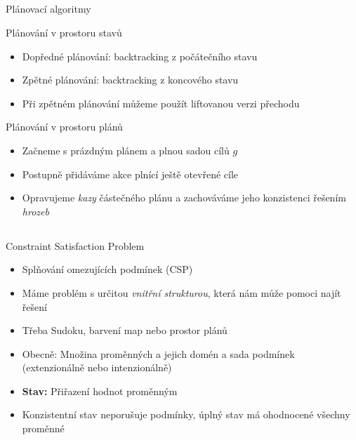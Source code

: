 \documentclass{beamer}
\begin{document}
\subsection{}
\begin{frame}{Plánovací algoritmy}
\begin{block}{Plánování v prostoru stavů}
\begin{itemize}
\item Dopředné plánování: backtracking z počátečního stavu
\item Zpětné plánování: backtracking z koncového stavu
\item Při zpětném plánování můžeme použít liftovanou verzi přechodu
\end{itemize}
\end{block}
\begin{block}{Plánování v prostoru plánů}
\begin{itemize}
\item Začneme s prázdným plánem a plnou sadou cílů $g$
\item Postupně přidáváme akce plnící ještě otevřené cíle
\item Opravujeme {\em kazy} částečného plánu a zachováváme jeho konzistenci řešením {\em hrozeb}
\end{itemize}
\end{block}
\end{frame}

\subsection{}
\begin{frame}{Constraint Satisfaction Problem}
\begin{itemize}
\item Splňování omezujících podmínek (CSP)
\item Máme problém s určitou {\em vnitřní strukturou}, která nám může pomoci najít řešení
\item Třeba Sudoku, barvení map nebo prostor plánů
\item Obecně: Množina proměnných a jejich domén a sada podmínek (extenzionálně nebo intenzionálně)
\item {\bf Stav:} Přiřazení hodnot proměnným
\item Konzistentní stav neporušuje podmínky, úplný stav má ohodnocené všechny proměnné
\end{itemize}
\end{frame}
\end{document}
